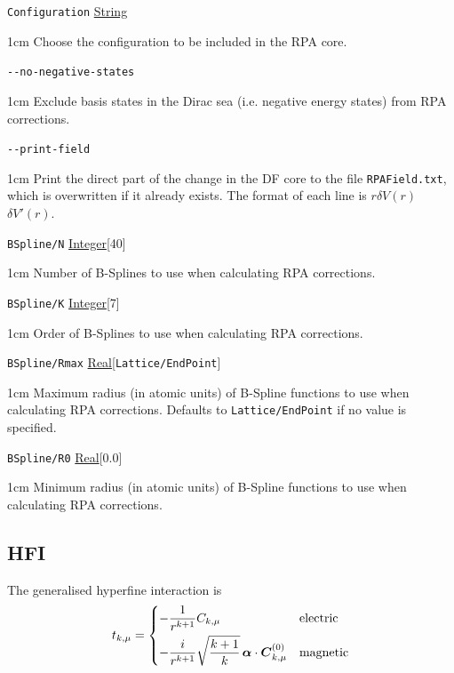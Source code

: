 \documentclass{report}
\begin{document}
\texttt{Configuration} \uline{String}
\begin{adjustwidth}{1cm}{}
	Choose the configuration to be included in the RPA core.
\end{adjustwidth}

\texttt{{-}{-}no-negative-states}
\begin{adjustwidth}{1cm}{}
Exclude basis states in the Dirac sea (i.e. negative energy states) from RPA corrections.
\end{adjustwidth}

\texttt{{-}{-}print-field}
\begin{adjustwidth}{1cm}{}
Print the direct part of the change in the DF core to the file \texttt{RPAField.txt},
which is overwritten if it already exists. The format of each line is
\quad $r$\quad $\delta V(r)$\quad $\delta V'(r)$.
\end{adjustwidth}

\texttt{BSpline/N} \uline{Integer}[40]
\begin{adjustwidth}{1cm}{}
Number of B-Splines to use when calculating RPA corrections.
\end{adjustwidth}

\texttt{BSpline/K} \uline{Integer}[7]
\begin{adjustwidth}{1cm}{}
Order of B-Splines to use when calculating RPA corrections.
\end{adjustwidth}

\texttt{BSpline/Rmax} \uline{Real}[\texttt{Lattice/EndPoint}]
\begin{adjustwidth}{1cm}{}
Maximum radius (in atomic units) of B-Spline functions to use when calculating RPA corrections. 
Defaults to \texttt{Lattice/EndPoint} if no value is specified.
\end{adjustwidth}

\texttt{BSpline/R0} \uline{Real}[0.0]
\begin{adjustwidth}{1cm}{}
Minimum radius (in atomic units) of B-Spline functions to use when calculating RPA corrections.
\end{adjustwidth}

\subsection{HFI}
\label{sec:HFI}

The generalised hyperfine interaction is
\[
t_{k,\mu} = \begin{dcases}
-\frac{1}{r^{k+1}}C_{k,\mu} & \textrm{electric} \\
-\frac{i}{r^{k+1}}\sqrt{\frac{k+1}{k}}\, \boldsymbol{\alpha}\cdot\boldsymbol{C}^{(0)}_{k,\mu} & \textrm{magnetic}
\end{dcases}
\]
\end{document}
